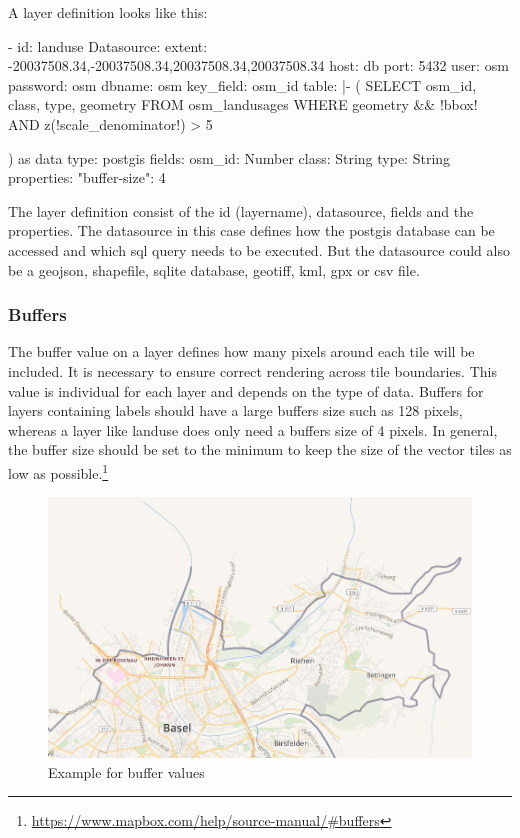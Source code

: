 A layer definition looks like this:
\begin{yamlcode}
- id: landuse
Datasource:
    extent: -20037508.34,-20037508.34,20037508.34,20037508.34
    host: db
    port: 5432
    user: osm
    password: osm
    dbname: osm
    key_field: osm_id
    table: |-
        (
            SELECT osm_id, class, type, geometry
            FROM osm_landusages
            WHERE geometry && !bbox!
            AND z(!scale_denominator!) > 5
        
        ) as data
    type: postgis
fields:
    osm_id: Number
    class: String
    type: String
properties:
    "buffer-size": 4
\end{yamlcode}
The layer definition consist of the id (layername), datasource, fields and the properties. The datasource in this case defines how the postgis database can be accessed and which sql query needs to be executed. But the datasource could also be a geojson, shapefile, sqlite database, geotiff, kml, gpx or csv file.


\subsubsection{Buffers}\label{buffers}
The buffer value on a layer defines how many pixels around each tile will be included. It is necessary to ensure correct rendering across tile boundaries. This value is individual for each layer and depends on the type of data. Buffers for layers containing labels should have a large buffers size such as 128 pixels, whereas a layer like landuse does only need a buffers size of 4 pixels. In general, the buffer size should be set to the minimum to keep the size of the vector tiles as low as possible.\footnote{\url{https://www.mapbox.com/help/source-manual/\#buffers}}

\begin{figure}[h]
  \centering
  \includegraphics[width=1\textwidth]{images/buffer.png}
  \caption{Example for buffer values}
\end{figure}

